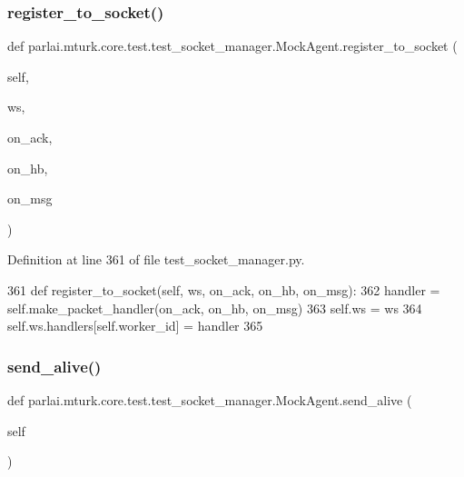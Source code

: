 \subsubsection{\texorpdfstring{register\+\_\+to\+\_\+socket()}{register\_to\_socket()}}
{\footnotesize\ttfamily def parlai.\+mturk.\+core.\+test.\+test\+\_\+socket\+\_\+manager.\+Mock\+Agent.\+register\+\_\+to\+\_\+socket (\begin{DoxyParamCaption}\item[{}]{self,  }\item[{}]{ws,  }\item[{}]{on\+\_\+ack,  }\item[{}]{on\+\_\+hb,  }\item[{}]{on\+\_\+msg }\end{DoxyParamCaption})}



Definition at line 361 of file test\+\_\+socket\+\_\+manager.\+py.


\begin{DoxyCode}
361     \textcolor{keyword}{def }register\_to\_socket(self, ws, on\_ack, on\_hb, on\_msg):
362         handler = self.make\_packet\_handler(on\_ack, on\_hb, on\_msg)
363         self.ws = ws
364         self.ws.handlers[self.worker\_id] = handler
365 
\end{DoxyCode}
\mbox{\label{classparlai_1_1mturk_1_1core_1_1test_1_1test__socket__manager_1_1MockAgent_adb451acb10da3f0da1537de776ae767a}} 
\subsubsection{\texorpdfstring{send\+\_\+alive()}{send\_alive()}}
{\footnotesize\ttfamily def parlai.\+mturk.\+core.\+test.\+test\+\_\+socket\+\_\+manager.\+Mock\+Agent.\+send\+\_\+alive (\begin{DoxyParamCaption}\item[{}]{self }\end{DoxyParamCaption})}



